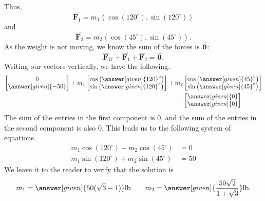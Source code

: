 \documentclass{ximera}
\renewcommand{\vec}[1]{{\overset{\boldsymbol{\rightharpoonup}}{\mathbf{#1}}}}
\renewcommand{\vector}[1]{\left\langle #1\right\rangle}
\begin{document}
\begin{example}
\begin{explanation}
\begin{image}
  \end{image}
    Thus,
    \[
    \vec F_1 = m_1\vector{\cos(120^\circ),\sin(120^\circ)}
    \]
    and
    \[
    \vec F_2 = m_2\vector{\cos(45^\circ),\sin(45^\circ)}.
    \]
    As the weight is not moving, we know the sum of the forces is
    $\vec 0$:
    \[
    \vec F_W + \vec F_1 + \vec F_2 = \vec 0.
    \]
    Writing our vectors vertically, we have the following.
    \begin{align*}
      \begin{bmatrix}
        0\\
        \answer[given]{-50}
      \end{bmatrix}
      +m_1
      \begin{bmatrix}
        \cos\left({\answer[given]{120}}^\circ\right)\\
        \sin\left({\answer[given]{120}}^\circ\right)
      \end{bmatrix}
      + m_2
      &\begin{bmatrix}
      \cos\left({\answer[given]{45}}^\circ\right)\\
      \sin\left({\answer[given]{45}}^\circ\right)
      \end{bmatrix}\\
      =
      &\begin{bmatrix}
        \answer[given]{0}\\
        \answer[given]{0}
      \end{bmatrix}
    \end{align*}
    The sum of the entries in the first component is 0, and the sum of
    the entries in the second component is also 0. This leads us to
    the following system of equations.
    \begin{align*}
      m_1\cos(120^\circ) + m_2\cos(45^\circ) &=0 \\
      m_1\sin(120^\circ) + m_2\sin(45^\circ) &=50
    \end{align*}
    We leave it to the reader to verify that the solution is
    \[
    m_1=\answer[given]{50(\sqrt{3}-1)}\mathrm{lb} \qquad m_2=\answer[given]{\frac{50\sqrt{2}}{1+\sqrt{3}}}\mathrm{lb}.
    \]
  \end{explanation}
\end{example}
\end{document}
